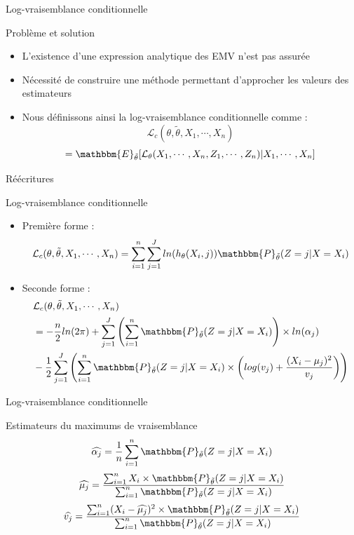 \documentclass[11pt]{beamer}
\begin{document}
	\begin{frame}{Log-vraisemblance conditionnelle}
		\begin{block}{Problème et solution}
			\begin{itemize}
				\item L'existence d'une expression analytique des EMV n'est pas assurée
				\item Nécessité de construire une méthode permettant d'approcher les valeurs des estimateurs

				\item Nous définissons ainsi la log-vraisemblance conditionnelle comme :
					\[
					\mathcal{L}_{c}(\theta, \tilde{\theta}, X_1, \cdots, X_n)
					\]
					\[ = \mathbbm{E}_{\tilde{\theta}}[\mathcal{L}_\theta(X_1, \cdots, X_n, Z_1, \cdots, Z_n) | X_1, \cdots, X_n]
					\]

			\end{itemize}
		\end{block}
	\end{frame}


	\begin{frame}{Réécritures}
		\begin{block}{Log-vraisemblance conditionnelle}
			\scriptsize
			\begin{itemize}
				\item Première forme :
				\[
				\mathcal{L}_{c}(\theta, \tilde{\theta}, X_1, \cdots, X_n) = \displaystyle\sum_{i=1}^n\sum_{j=1}^J ln(h_\theta(X_i ,j))  \mathbbm{P}_{\tilde{\theta}}(Z = j|X = X_i)
				\]
				\item Seconde forme :
				\begin{align*}
				 & \mathcal{L}_{c}(\theta, \tilde{\theta}, X_1, \cdots, X_n) \\
				 &= -\frac{n}{2}ln(2\pi)+\sum_{j=1}^J \left(\sum_{i = 1}^n \mathbbm{P}_{\tilde{\theta}}(Z= j|X=X_i)\right) \times ln(\alpha_j) \\				
				&-\frac{1}{2}\sum_{j=1}^J\left(\sum_{i=1}^n  \mathbbm{P}_{\tilde{\theta}}(Z=j|X=X_i)\times\left(log(v_j)+\frac{(X_i-\mu_j)^2}{v_j}\right)\right)
				\end{align*}

			\end{itemize}
		\end{block}
	\end{frame}

	\begin{frame}{Log-vraisemblance conditionnelle}
		\begin{block}{Estimateurs du maximums de vraisemblance}
			\[
			\widehat{\alpha_j} = \frac{1}{n}\sum_{i=1}^n \mathbbm{P}_{\tilde{\theta}}(Z=j|X=X_i)
			\]
			\[
			\widehat{\mu_j}= \frac{\sum_{i=1}^n X_i\times\mathbbm{P}_{\tilde{\theta}}(Z=j|X=X_i)}{\sum_{i=1}^n \mathbbm{P}_{\tilde{\theta}}(Z=j|X=X_i)}
			\]
			\[
			\widehat{v_j} = \frac{\sum_{i=1}^n (X_i -\widehat{\mu_j})^2 \times\mathbbm{P}_{\tilde{\theta}}(Z=j|X=X_i)}{\sum_{i=1}^n\mathbbm{P}_{\tilde{\theta}}(Z=j|X=X_i)}
			\]			
		\end{block}
	\end{frame}
	
\end{document}
